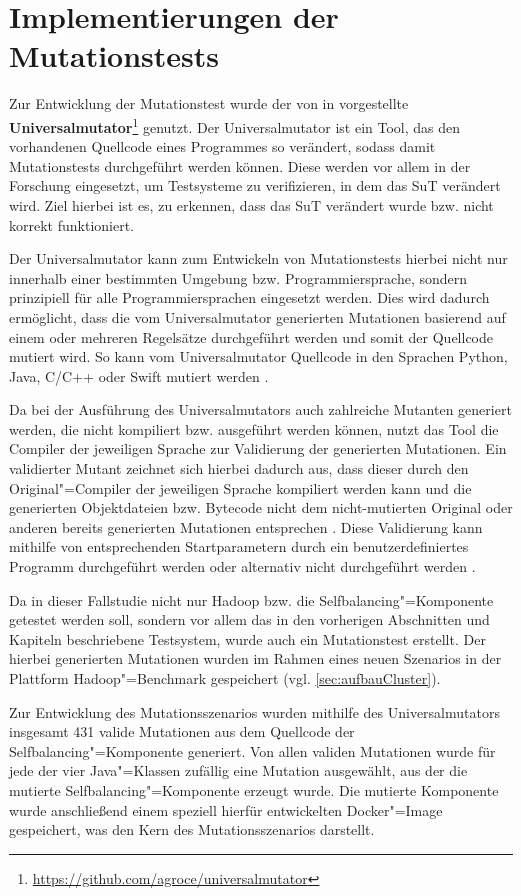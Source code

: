 \section{Implementierungen der Mutationstests}
\label{sec:implMutationTests}

Zur Entwicklung der Mutationstest wurde der von \citeauthor{Groce2018} in \cite{Groce2018} vorgestellte \textbf{Universalmutator}\footnote{\url{https://github.com/agroce/universalmutator}} genutzt.
Der Universalmutator ist ein Tool, das den vorhandenen Quellcode eines Programmes so verändert, sodass damit Mutationstests durchgeführt werden können.
Diese werden vor allem in der Forschung eingesetzt, um Testsysteme zu verifizieren, in dem das \ac{SuT} verändert wird.
Ziel hierbei ist es, zu erkennen, dass das \ac{SuT} verändert wurde bzw. nicht korrekt funktioniert.

Der Universalmutator kann zum Entwickeln von Mutationstests hierbei nicht nur innerhalb einer bestimmten Umgebung bzw. Programmiersprache, sondern prinzipiell für alle Programmiersprachen eingesetzt werden.
Dies wird dadurch ermöglicht, dass die vom Universalmutator generierten Mutationen basierend auf einem oder mehreren Regelsätze durchgeführt werden und somit der Quellcode mutiert wird.
So kann vom Universalmutator Quellcode \uA in den Sprachen Python, Java, C/C++ oder Swift mutiert werden \cite{Groce2018}.

Da bei der Ausführung des Universalmutators auch zahlreiche Mutanten generiert werden, die nicht kompiliert bzw. ausgeführt werden können, nutzt das Tool die Compiler der jeweiligen Sprache zur Validierung der generierten Mutationen.
Ein validierter Mutant zeichnet sich hierbei dadurch aus, dass dieser durch den Original"=Compiler der jeweiligen Sprache kompiliert werden kann und die generierten Objektdateien bzw. Bytecode nicht dem nicht-mutierten Original oder anderen bereits generierten Mutationen entsprechen \cite{Groce2018}.
Diese Validierung kann mithilfe von entsprechenden Startparametern durch ein benutzerdefiniertes Programm durchgeführt werden oder alternativ nicht durchgeführt werden \cite{Groce2018,UniversalmutatorSourceGenmutants}.

Da in dieser Fallstudie nicht nur Hadoop bzw. die Selfbalancing"=Komponente getestet werden soll, sondern vor allem das in den vorherigen Abschnitten und Kapiteln beschriebene Testsystem, wurde auch ein Mutationstest erstellt.
Der hierbei generierten Mutationen wurden im Rahmen eines neuen Szenarios in der Plattform Hadoop"=Benchmark gespeichert (vgl. \autoref{sec:aufbauCluster}).

Zur Entwicklung des Mutationsszenarios wurden mithilfe des Universalmutators insgesamt 431 valide Mutationen aus dem Quellcode der Selfbalancing"=Komponente generiert.
Von allen validen Mutationen wurde für jede der vier Java"=Klassen zufällig eine Mutation ausgewählt, aus der die mutierte Selfbalancing"=Komponente erzeugt wurde.
Die mutierte Komponente wurde anschließend einem speziell hierfür entwickelten Docker"=Image gespeichert, was den Kern des Mutationsszenarios darstellt.

